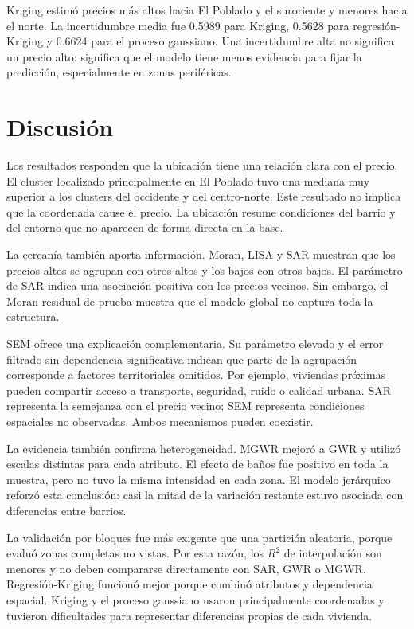 \documentclass[conference]{IEEEtran}
\begin{document}
Kriging estimó precios más altos hacia El Poblado y el suroriente y menores hacia el norte. La incertidumbre media fue 0.5989 para Kriging, 0.5628 para regresión-Kriging y 0.6624 para el proceso gaussiano. Una incertidumbre alta no significa un precio alto: significa que el modelo tiene menos evidencia para fijar la predicción, especialmente en zonas periféricas.

\FloatBarrier

\section{Discusión}

Los resultados responden que la ubicación tiene una relación clara con el precio. El cluster localizado principalmente en El Poblado tuvo una mediana muy superior a los clusters del occidente y del centro-norte. Este resultado no implica que la coordenada cause el precio. La ubicación resume condiciones del barrio y del entorno que no aparecen de forma directa en la base.

La cercanía también aporta información. Moran, LISA y SAR muestran que los precios altos se agrupan con otros altos y los bajos con otros bajos. El parámetro de SAR indica una asociación positiva con los precios vecinos. Sin embargo, el Moran residual de prueba muestra que el modelo global no captura toda la estructura.

SEM ofrece una explicación complementaria. Su parámetro elevado y el error filtrado sin dependencia significativa indican que parte de la agrupación corresponde a factores territoriales omitidos. Por ejemplo, viviendas próximas pueden compartir acceso a transporte, seguridad, ruido o calidad urbana. SAR representa la semejanza con el precio vecino; SEM representa condiciones espaciales no observadas. Ambos mecanismos pueden coexistir.

La evidencia también confirma heterogeneidad. MGWR mejoró a GWR y utilizó escalas distintas para cada atributo. El efecto de baños fue positivo en toda la muestra, pero no tuvo la misma intensidad en cada zona. El modelo jerárquico reforzó esta conclusión: casi la mitad de la variación restante estuvo asociada con diferencias entre barrios.

La validación por bloques fue más exigente que una partición aleatoria, porque evaluó zonas completas no vistas. Por esta razón, los $R^2$ de interpolación son menores y no deben compararse directamente con SAR, GWR o MGWR. Regresión-Kriging funcionó mejor porque combinó atributos y dependencia espacial. Kriging y el proceso gaussiano usaron principalmente coordenadas y tuvieron dificultades para representar diferencias propias de cada vivienda.
\end{document}
